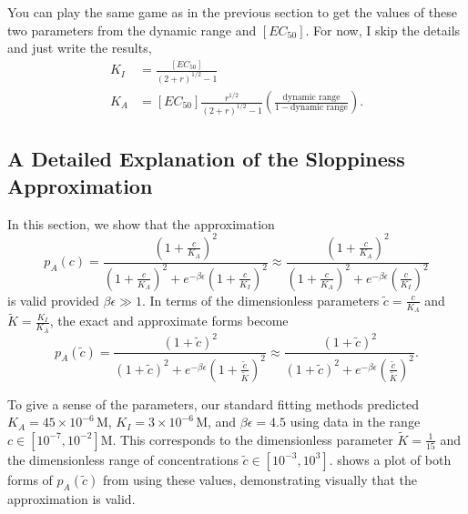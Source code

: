 You can play the same game as in the previous section to get the values of these two parameters from the dynamic range and $[EC_{50}]$. For now, I skip the details and just write the results,
\begin{align}
K_I &= \frac{[EC_{50}]}{\left(2+r\right)^{1/2}-1}\\
K_A &= [EC_{50}] \frac{r^{1/2}}{\left(2+r\right)^{1/2}-1} \left(\frac{\text{dynamic range}}{1-\text{dynamic range}}\right).
\end{align}

\pagebreak
\subsection{A Detailed Explanation of the Sloppiness Approximation}

In this section, we show that the approximation 
\begin{equation}
p_A(c)=\frac{\left(1+\frac{c}{K_A}\right)^2}{\left(1+\frac{c}{K_A}\right)^2+e^{-\beta \epsilon }\left(1+\frac{c}{K_I}\right)^2}\approx \frac{\left(1+\frac{c}{K_A}\right)^2}{\left(1+\frac{c}{K_A}\right)^2+e^{-\beta
		\epsilon }\left(\frac{c}{K_I}\right)^2}
\end{equation}
is valid provided \(\beta \epsilon \gg 1\). In terms of the dimensionless
parameters \(\tilde{c}=\frac{c}{K_A}\) and \(\tilde{K}=\frac{K_I}{K_A}\), the
exact and approximate forms become
\begin{equation} \label{AppendixEqSloppiness}
p_A\left(\tilde{c}\right)=\frac{\left(1+\tilde{c}\right)^2}{\left(1+\tilde{c}\right)^2+e^{-\beta \epsilon }\left(1+\frac{\tilde{c}}{\tilde{K}}\right)^2}\approx
\frac{\left(1+\tilde{c}\right)^2}{\left(1+\tilde{c}\right)^2+e^{-\beta \epsilon }\left(\frac{\tilde{c}}{\tilde{K}}\right)^2}.
\end{equation}

To give a sense of the parameters, our standard fitting methods predicted
\(K_A=45 \times 10^{-6}\,\text{M}\), \(K_I=3 \times 10^{-6}\,\text{M}\), and
\(\beta \epsilon =4.5\) using data in the range \(c\in
\left[10^{-7},10^{-2}\right]\text{M}\). This corresponds to the dimensionless parameter
\(\tilde{K}=\frac{1}{15}\) and the dimensionless range of concentrations \(\tilde{c}\in \left[10^{-3},10^3\right]\). \fref[SIfigSloppiness] shows a plot of both forms of
$p_A(\tilde{c})$ from \eref[AppendixEqSloppiness] using these values,
demonstrating visually that the approximation is valid.

